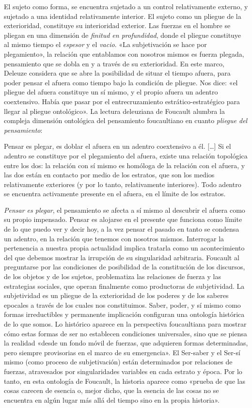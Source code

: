El sujeto como forma, se encuentra sujetado a un control relativamente externo, y sujetado a una identidad relativamente interior. El sujeto como un pliegue de la exterioridad, constituye su interioridad exterior. Las fuerzas en el hombre se pliegan en una dimensión de \emph{finitud en profundidad}, donde el pliegue constituye al mismo tiempo el \emph{espesor} y el \emph{vacio}. «La subjetivación se hace por plegamiento», la relación que entablamos con nosotros mismos es fuerza plegada, pensamiento que se dobla en y a través de su exterioridad. En este marco, Deleuze considera que se abre la posibilidad de situar el tiempo afuera, para poder pensar el afuera como tiempo bajo la condición de pliegue. Nos dice: «el pliegue del afuera constituye un sí mismo, y el propio afuera un adentro coextensivo. Había que pasar por el entrecruzamiento estrático-estratégico para llegar al pliegue ontológico». La lectura deleuziana de Foucault alumbra la compleja dimensión ontológica del pensamiento foucaultiano en cuanto \emph{pliegue del pensamiento}:

Pensar es plegar, es doblar el afuera en un adentro coextensivo a él. {[}\ldots{]} Si el adentro se constituye por el plegamiento del afuera, existe una relación topológica entre los dos: la relación con sí mismo es homóloga de la relación con el afuera, y las dos están en contacto por medio de los estratos, que son los medios relativamente exteriores (y por lo tanto, relativamente interiores). Todo adentro se encuentra activamente presente en el afuera, en el límite de los estratos.

\emph{Pensar es plegar}, el pensamiento se afecta a sí mismo al descubrir el afuera como su propio impensado. Pensar es alojarse en el presente que funciona como límite de lo que puedo ver y decir hoy, a la vez pensar el pasado en tanto se condensa un adentro, en la relación que tenemos con nosotros mismos. Interrogar la pertenencia a nuestra propia actualidad implica tratarla como un acontecimiento del que debemos mostrar la irrupción de su singularidad arbitraria. Foucault al preguntarse por las condiciones de posibilidad de la constitución de los discursos, de los objetos y de los sujetos, problematiza las relaciones de fuerza y las estrategias sociales, que operan finalmente como productoras de subjetividad. La subjetividad es un pliegue de la exterioridad de los poderes y de los saberes epocales a través de los cuales nos constituimos. Saber, poder, y sí mismo como formas irreductibles y permanente implicación configuran una ontología histórica de lo que somos. Lo histórico aparece en la perspectiva foucaultiana para mostrar cómo estas formas de ser no establecen condiciones universales, sino que se piensa la realidad «desde un fondo móvil de fuerzas, que adquieren formas determinadas, pero siempre provisorias en el marco de su emergencia». El Ser-saber y el Ser-sí mismo (como proceso de subjetivación) están determinados por relaciones de fuerzas, atravesados por singularidades variables en cada estrato y época. Por lo tanto, en esta ontología de Foucault, la historia aparece como «prueba de que las cosas carecen de esencia o, mejor dicho, que la esencia de las cosas no se encuentra en algún lugar más allá del tiempo sino en la propia historia».

